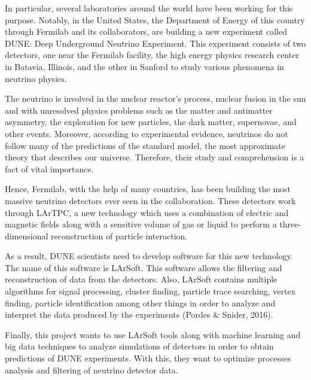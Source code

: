 \documentclass[paper=a4paper, fontsize=12pt]{scrartcl} %
\numberwithin{equation}{section} %
\numberwithin{figure}{section} %
\numberwithin{table}{section} %
\begin{document}
In particular, several laboratories around the world have been working for this purpose. Notably, in the United States, the Department of Energy of this country through Fermilab and its collaborators, are building a new experiment called DUNE: Deep Underground Neutrino Experiment. This experiment consists of two detectors, one near the Fermilab facility, the high energy physics research center in Batavia, Illinois, and the other in Sanford to study various phenomena in neutrino physics.

The neutrino is involved in the nuclear reactor's process, nuclear fusion in the sun and with unresolved physics problems such as the matter and antimatter asymmetry, the exploration for new particles,  the dark matter, supernovae, and other events. Moreover, according to experimental evidence, neutrinos do not follow many of the predictions of the standard model, the most approximate theory that describes our universe. Therefore, their study and comprehension is a fact of vital importance.

Hence, Fermilab, with the help of many countries, has been building the most massive neutrino detectors ever seen in the collaboration. These detectors work through LArTPC, a new technology which uses a combination of electric and magnetic fields along with a sensitive volume of gas or liquid to perform a three-dimensional reconstruction of particle interaction.

As a result,  DUNE scientists need to develop software for this new technology. The name of this software is LArSoft. This software allows the filtering and reconstruction of data from the detectors. Also, LArSoft contains multiple algorithms for signal processing, cluster finding, particle trace searching, vertex finding, particle identification among other things in order to analyze and interpret the data produced by the experiments (Pordes $\&$ Snider, 2016).

Finally, this project wants to use LArSoft tools along with machine learning and big data techniques to analyze simulations of detectors in order to obtain predictions of DUNE experiments. With this, they want to optimize processes analysis and filtering of neutrino detector data. 
\end{document}
